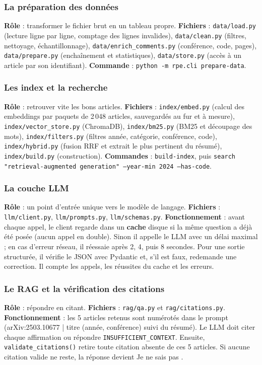 \documentclass[11pt,a4paper]{article}
\newcommand{\code}[1]{\texttt{#1}}
\begin{document}
\subsubsection{La préparation des données}
\textbf{Rôle} : transformer le fichier brut en un tableau propre. \textbf{Fichiers} :
\code{data/load.py} (lecture ligne par ligne, comptage des lignes invalides),
\code{data/clean.py} (filtres, nettoyage, échantillonnage), \code{data/enrich\_comments.py}
(conférence, code, pages), \code{data/prepare.py} (enchaînement et statistiques),
\code{data/store.py} (accès à un article par son identifiant).
\textbf{Commande} : \code{python -m rpe.cli prepare-data}.

\subsubsection{Les index et la recherche}
\textbf{Rôle} : retrouver vite les bons articles. \textbf{Fichiers} : \code{index/embed.py}
(calcul des embeddings par paquets de 2\,048 articles, sauvegardés au fur et à mesure),
\code{index/vector\_store.py} (ChromaDB), \code{index/bm25.py} (BM25 et découpage des mots),
\code{index/filters.py} (filtres année, catégorie, conférence, code), \code{index/hybrid.py}
(fusion RRF et extrait le plus pertinent du résumé), \code{index/build.py} (construction).
\textbf{Commandes} : \code{build-index}, puis
\code{search "retrieval-augmented generation" --year-min 2024 --has-code}.

\subsubsection{La couche LLM}
\textbf{Rôle} : un point d'entrée unique vers le modèle de langage. \textbf{Fichiers} :
\code{llm/client.py}, \code{llm/prompts.py}, \code{llm/schemas.py}.
\textbf{Fonctionnement} : avant chaque appel, le client regarde dans un \textbf{cache}
disque si la même question a déjà été posée (aucun appel en double). Sinon il appelle le
LLM avec un délai maximal ; en cas d'erreur réseau, il réessaie après 2, 4, puis 8
secondes. Pour une sortie structurée, il vérifie le JSON avec Pydantic et, s'il est faux,
redemande une correction. Il compte les appels, les réussites du cache et les erreurs.

\subsubsection{Le RAG et la vérification des citations}
\textbf{Rôle} : répondre en citant. \textbf{Fichiers} : \code{rag/qa.py} et
\code{rag/citations.py}. \textbf{Fonctionnement} : les 5 articles retenus sont numérotés
dans le prompt (\og [1] arXiv:2503.10677 | titre (année, conférence) \fg{} suivi du
résumé). Le LLM doit citer chaque affirmation ou répondre \code{INSUFFICIENT\_CONTEXT}.
Ensuite, \code{validate\_citations()} retire toute citation absente de ces 5 articles. Si
aucune citation valide ne reste, la réponse devient \og Je ne sais pas \fg{}.
\end{document}
